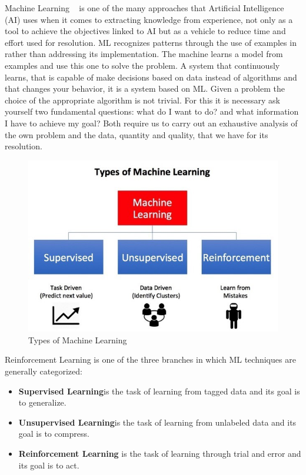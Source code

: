 Machine Learning ~\cite{ml4dummies} is one of the many approaches that Artificial Intelligence (AI) uses when it comes to extracting knowledge from experience, not only as a tool to
achieve the objectives linked to AI but as a vehicle to reduce time and effort
used for resolution. ML recognizes patterns through the use of examples in
rather than addressing its implementation. The machine learns a model from examples and
use this one to solve the problem. A system that continuously learns, that is capable of
make decisions based on data instead of algorithms and that changes your behavior, it is a system based on ML.
Given a problem the choice of the appropriate algorithm is not trivial. For this it is necessary
ask yourself two fundamental questions: what do I want to do? and what information
I have to achieve my goal? Both require us to carry out an exhaustive analysis of the
own problem and the data, quantity and quality, that we have for its resolution.

\begin{figure}[hp!]
	\centering	\includegraphics[scale=0.50]{imaxes/machine_learning.jpeg}
	\caption{Types of Machine Learning}
	\label{fig:ml_types}
\end{figure}


Reinforcement Learning is one of the three branches in which ML techniques are generally categorized:

\begin{itemize}
	\item \textbf{Supervised Learning}is the task of learning from tagged data and its goal is to generalize.
	\item \textbf{Unsupervised Learning}is the task of learning from unlabeled data and its goal is to compress.
	\item \textbf{Reinforcement Learning} is the task of learning through trial and error and its goal is to act.
\end{itemize}

